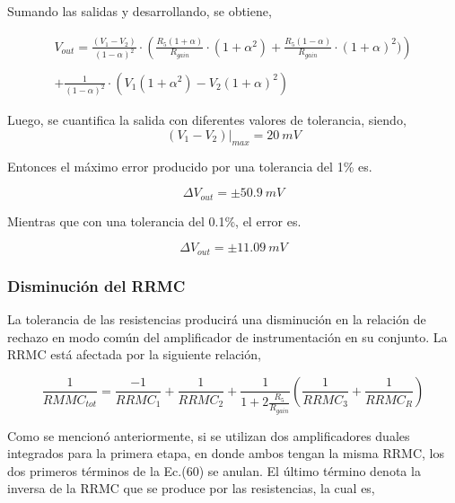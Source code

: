 \documentclass[12pt,A4paper,titlepage]{article}
\begin{document}
\bigskip
\hspace{1mm} Sumando las salidas y desarrollando, se obtiene,

\begin{multline}
    V_{out} = \frac{(V_1 - V_2)}{(1 - \alpha)^2} \cdot \left(\frac{R_5 (1 + \alpha)}{R_{gain}} \cdot (1 + \alpha^2) + \frac{R_5 (1 - \alpha)}{R_{gain}} \cdot (1 + \alpha)^2)\right)
    \\
    \\ + \frac{1}{(1 - \alpha)^2} \cdot (V_1 (1 +\alpha^2) - V_2 (1 + \alpha)^2)
\end{multline}

\bigskip
\hspace{1mm} Luego, se cuantifica la salida con diferentes valores de tolerancia, siendo,
\begin{equation}
    (V_1 - V_2)|_{max} = 20 ~mV
\end{equation}

\bigskip
Entonces el máximo error producido por una tolerancia del 1\% es.

\begin{equation}
    \Delta V_{out} = \pm 50.9 ~mV
\end{equation}

\bigskip
\hspace{1mm} Mientras que con una tolerancia del 0.1\%, el error es.

\begin{equation}
    \Delta V_{out} = \pm 11.09 ~mV
\end{equation}

\subsubsection{Disminución del RRMC}
\hspace{1mm} La tolerancia de las resistencias producirá una disminución en la relación de rechazo en modo común del amplificador de instrumentación en su conjunto. La RRMC está afectada por la siguiente relación,

\begin{equation}
    \frac{1}{RMMC_{tot}}=\frac{-1}{RRMC_1}+\frac{1}{RRMC_2}+\frac{1}{1+2\frac{R_5}{R_{gain}}}\left(\frac{1}{RRMC_3}+\frac{1}{RRMC_R}\right)
\end{equation}

\bigskip
Como se mencionó anteriormente, si se utilizan dos amplificadores duales integrados para la primera etapa, en donde ambos tengan la misma RRMC, los dos primeros términos de la Ec.(60) se anulan. El último término denota la inversa de la RRMC que se produce por las resistencias, la  cual es,
\end{document}
